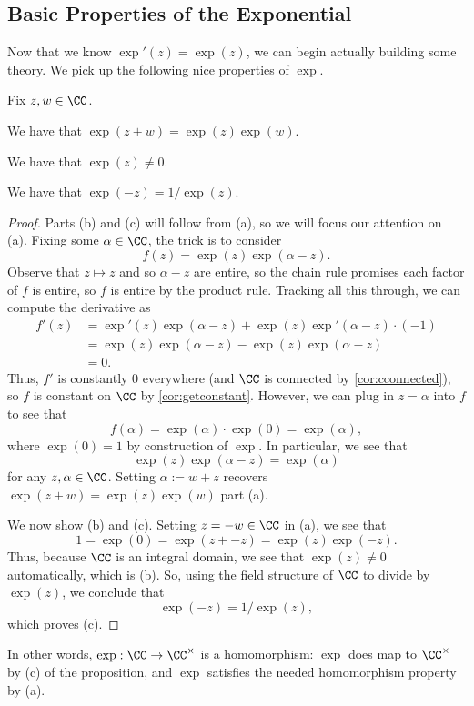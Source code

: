\subsection{Basic Properties of the Exponential}
Now that we know $\exp'(z)=\exp(z)$, we can begin actually building some theory. We pick up the following nice properties of $\exp$.
\begin{prop} \label{prop:exphom}
	Fix $z,w\in\CC$.
	\begin{listalph}
		\item We have that $\exp(z+w)=\exp(z)\exp(w)$.
		\item We have that $\exp(z)\ne0$.
		\item We have that $\exp(-z)=1/\exp(z)$.
	\end{listalph}
\end{prop}
\begin{proof}
	Parts (b) and (c) will follow from (a), so we will focus our attention on (a). Fixing some $\alpha\in\CC$, the trick is to consider
	\[f(z)=\exp(z)\exp(\alpha-z).\]
	Observe that $z\mapsto z$ and so $\alpha-z$ are entire, so the chain rule promises each factor of $f$ is entire, so $f$ is entire by the product rule. Tracking all this through, we can compute the derivative as
	\begin{align*}
		f'(z) &= \exp'(z)\exp(\alpha-z)+\exp(z)\exp'(\alpha-z)\cdot(-1) \\
		&= \exp(z)\exp(\alpha-z)-\exp(z)\exp(\alpha-z) \\
		&= 0.
	\end{align*}
	Thus, $f'$ is constantly $0$ everywhere (and $\CC$ is connected by \autoref{cor:cconnected}), so $f$ is constant on $\CC$ by \autoref{cor:getconstant}. However, we can plug in $z=\alpha$ into $f$ to see that
	\[f(\alpha)=\exp(\alpha)\cdot\exp(0)=\exp(\alpha),\]
	where $\exp(0)=1$ by construction of $\exp$. In particular, we see that
	\[\exp(z)\exp(\alpha-z)=\exp(\alpha)\]
	for any $z,\alpha\in\CC$. Setting $\alpha:=w+z$ recovers $\exp(z+w)=\exp(z)\exp(w)$ part (a).

	We now show (b) and (c). Setting $z=-w\in\CC$ in (a), we see that
	\[1=\exp(0)=\exp(z+-z)=\exp(z)\exp(-z).\]
	Thus, because $\CC$ is an integral domain, we see that $\exp(z)\ne0$ automatically, which is (b). So, using the field structure of $\CC$ to divide by $\exp(z)$, we conclude that
	\[\exp(-z)=1/\exp(z),\]
	which proves (c).
\end{proof}
\begin{remark}[Nir]
	In other words, $\exp:\CC\to\CC^\times$ is a homomorphism: $\exp$ does map to $\CC^\times$ by (c) of the proposition, and $\exp$ satisfies the needed homomorphism property by (a).
\end{remark}
